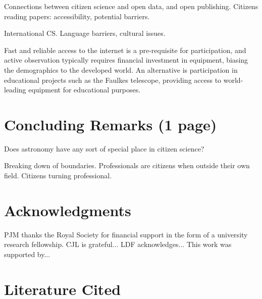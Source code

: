 \documentclass{ar2e}
\begin{document}
Connections between citizen science and open data, and open publishing. 
Citizens reading papers: accessibility, potential barriers. 

International CS. Language barriers, cultural issues. 

Fast and reliable access  to the internet is
a pre-requisite for participation, and active  observation typically requires
financial investment in equipment,  biasing the demographics to the developed
world.  An alternative is  participation in educational projects such as the
Faulkes telescope,  providing access to world-leading equipment for
educational purposes.


\section{Concluding Remarks (1 page)}
\label{sec:conclusions}

Does astronomy have any sort of special place in citizen science?

Breaking down of boundaries. Professionals are citizens when outside their own
field. Citizens turning professional.


\section*{Acknowledgments}


PJM thanks the Royal Society for financial support in the form of a university
research fellowship. 
%
CJL is grateful...
%
LDF acknowledges...
% 
This work was supported by...


\section{Literature Cited}





\end{document}
